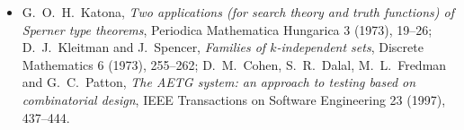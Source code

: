 \begin{itemize}
B.~Stevens, I.~Kotsireas and V.~Ganesh, \emph{A SAT-based resolution of Lam's problem}, Proceedings of AAAI 2021, 3669--3676.
\item G.~O.~H.~Katona, \emph{Two applications (for search theory and truth functions) of Sperner type theorems}, Periodica Mathematica Hungarica 3 (1973), 19--26; D.~J.~Kleitman and J.~Spencer, \emph{Families of
$k$-independent sets}, Discrete Mathematics 6 (1973), 255--262; D.~M.~Cohen, S.~R.~Dalal, M.~L.~Fredman and G.~C.~Patton, \emph{The AETG system: an approach to testing based on combinatorial design}, IEEE Transactions on
Software Engineering 23 (1997), 437--444.
\end{itemize}
